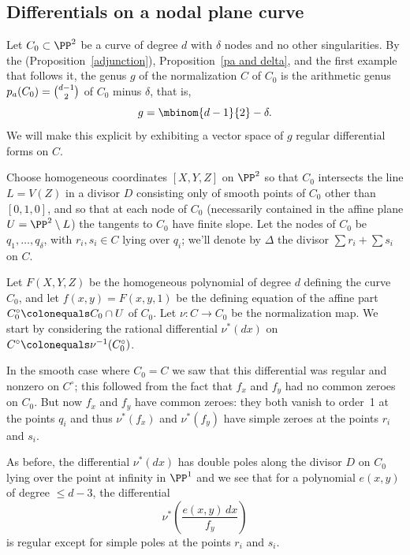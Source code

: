 \subsection{Differentials on a nodal plane curve}\label{canonical series on nodal plane curves}

Let $C_{0} \subset \PP^2$  be a curve of degree $d$ with $\delta$
nodes and no other singularities. By the 
%
%
%
 (Proposition~\ref{adjunction}), 
Proposition~\ref{pa and delta}, and the first example that follows it, 
the genus $g$ of the normalization $C$ of $C_{0}$ is
the arithmetic genus $p_{a}(C_{0}) = \tbinom{d-1}{2}$ 
of $C_{0}$ minus $\delta$, that is,
$$
g = \mbinom{d-1}{2} -\delta.
$$
We will make this explicit by 
%
%
exhibiting a vector space of $g$ regular differential forms on $C$.

Choose homogeneous coordinates  $[X,Y,Z]$ on $\PP^2$ so that
$C_0$ intersects the line $L = V(Z)$ in a divisor $D$ consisting only
of smooth points of $C_{0}$  other than $[0,1,0]$, and 
so that at each node of $C_0$ (necessarily contained in the affine plane $U = \PP^2 \setminus L$) the tangents to $C_0$ have finite slope.
Let the nodes of $C_0$ be $q_1,\dots,q_\delta$, with $r_i, s_i \in C$ lying 
over $q_i$; we'll denote by $\Delta$ the divisor $\sum r_i + \sum s_i$ on $C$. 

Let $F(X,Y,Z)$ be the homogeneous polynomial of degree $d$ defining
the curve $C_0$, and let $f(x,y) = F(x,y,1)$ be the defining equation
of the affine part $C_{0}^{\circ}\colonequals  C_0 \cap U$ of $C_0$.
Let $\nu: C\to C_0$ be the normalization map. We start by considering
the rational differential 
%
$\nu^*(dx)$ on 
$C^{\circ}\colonequals  \nu^{-1}(C_{0}^{\circ})$. 

In the smooth case where $C_{0}=C$ we saw that this differential was
regular and nonzero on $C^{\circ}$; this followed from the fact 
that $f_{x}$ and $f_{y}$ had no common zeroes on $C_0$. But now
$f_{x}$ and $f_{y}$ have common zeroes: they both vanish to order~1 at
the points $q_{i}$ and thus $\nu^*(f_{x})$ and $\nu^*(f_{y})$ have
simple zeroes at the points $r_i$ and $s_i$.

As before, the differential $\nu^*(dx)$ 
has  double poles along the divisor
$D$ on $C_{0}$ lying over the point at infinity in $\PP^{1}$
and we see that for a polynomial $e(x,y)$ of degree $\leq d-3$, the
differential
$$
\nu^*\left( \frac{e(x,y)\,dx}{f_{y}}\right)
$$
is regular except for simple poles at the points $r_i$ and $s_i$.

